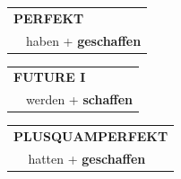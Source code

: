 \documentclass[10pt,a4paper]{revtex4-2}
\begin{document}
\begin{verbbox-acc}
    \vspace{10pt}

 \begin{tabular}{rl}
     \multicolumn{2}{l}{\textbf{PERFEKT}}\\
   & haben + \textbf{geschaffen}\\
  \end{tabular}
\hfill
   \begin{tabular}{rl}
   
    \multicolumn{2}{l}{\textbf{FUTURE I} }\\
  &  werden + \textbf{schaffen}\\
 
  \end{tabular}
\hfill
   \begin{tabular}{rl}
      \multicolumn{2}{l}{\textbf{PLUSQUAMPERFEKT}}\\
  &  hatten + \textbf{geschaffen}\\
  \end{tabular}
  
  \vspace{-5pt}


\end{verbbox-acc}
\end{document}
